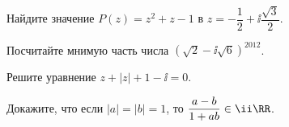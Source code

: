 %
%


\begin{problems}

\item
Найдите значение $P(z) = z^2 + z - 1$ в
$z = - \dfrac{1}{2} + \ii \dfrac{\sqrt{3}}{2}$.

\item
Посчитайте мнимую часть числа
$\left(\sqrt{2} - \ii \sqrt{6}\right)^{2012}$.

\item
Решите уравнение
$z + |z| + 1 - \ii = 0$.

\item
Докажите, что если
$|a| = |b| = 1$,
то
$\dfrac{a - b}{1 + a b} \in \ii \RR$.

\end{problems}

